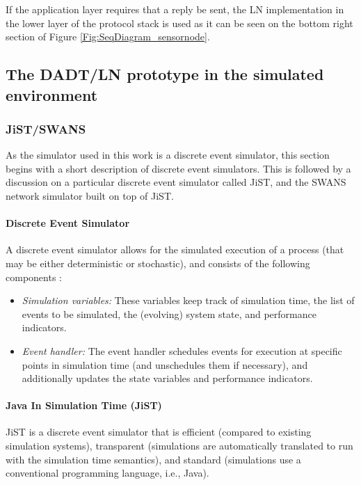 If the application layer requires that a reply be sent, the LN implementation in
the lower layer of the protocol stack is used as it can be seen on the bottom
right section of Figure \ref{Fig:SeqDiagram_sensornode}.



\subsection{The DADT/LN prototype in the simulated environment}
\subsubsection {JiST/SWANS} \label{sec:jistswans}

As the simulator used in this work is a discrete event simulator, this section 
begins with a short description of discrete event simulators. 
This is followed by a discussion on a particular discrete event simulator
called JiST, and the SWANS network simulator built on top of JiST.

\paragraph{Discrete Event Simulator}

A discrete event simulator allows for the simulated execution of a process (that
may be either deterministic or stochastic), and consists of the following
components \cite{Shankar_DiscreteEventSim}:

\begin{itemize}
  \item \emph{Simulation variables:} These variables keep track of simulation 
  time, the list of events to be simulated, the (evolving) system state, and 
  performance indicators.
  \item \emph{Event handler:} The event handler schedules events for execution 
  at specific points in simulation time (and unschedules them if necessary), 
  and additionally updates the state variables and performance indicators.
\end{itemize}
 
\paragraph{Java In Simulation Time (JiST)} \label{subsec:jist}

JiST \cite{barr_JIST:2005} is a discrete event simulator that is 
efficient (compared to existing simulation systems), 
transparent (simulations are automatically translated to run with the 
simulation time semantics), and standard (simulations use a
conventional programming language, i.e., Java).

